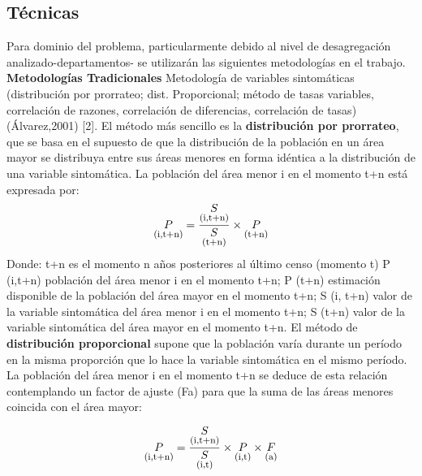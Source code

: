 \documentclass{article}
\theoremstyle{mytheoremstyle}
\theoremstyle{mytheoremstyle}
\theoremstyle{myproblemstyle}
\begin{document}
\subsection{Técnicas }
Para dominio del problema, particularmente debido al nivel de desagregación analizado-departamentos-
se utilizarán las siguientes metodologías en el trabajo.\newline
\textbf{Metodologías Tradicionales}\newline
Metodología de variables sintomáticas (distribución por prorrateo; dist. Proporcional; método de tasas variables,
 correlación de razones, correlación de diferencias, correlación de tasas) (Álvarez,2001) [2].
 \newline El método más sencillo es la \textbf{distribución por prorrateo}, que se
basa en el supuesto de que la distribución de la población en un área
mayor se distribuya entre sus áreas menores en forma idéntica a la
distribución de una variable sintomática. La población del área menor
i en el momento t+n está expresada por:
\begin{equation}
  \underset{\textstyle \text{\footnotesize(i,t+n)}}{P}=\frac{\underset{\textstyle \text{\footnotesize(i,t+n)}}{S}}{\underset{\textstyle\text{\footnotesize(t+n)}}{S}} \times \underset{\textstyle \text{\footnotesize(t+n)}}{P}
\end{equation}
Donde:\newline
t+n es el momento n años posteriores al último censo (momento t)\newline
P (i,t+n) población del área menor i en el momento t+n;\newline
P (t+n) estimación disponible de la población del área mayor en el momento t+n;\newline
S (i, t+n) valor de la variable sintomática del área menor i en el momento t+n;\newline
S (t+n) valor de la variable sintomática del área mayor en el momento t+n.\newline
El método de \textbf{distribución proporcional} supone que la población varía durante un período en
 la misma proporción que lo hace la variable sintomática en el mismo período. La población del área
menor i en el momento t+n se deduce de esta relación contemplando un factor de ajuste (Fa) para
que la suma de las áreas menores coincida con el área mayor:

\begin{equation}
  \underset{\textstyle \text{\footnotesize(i,t+n)}}{P}=\frac{\underset{\textstyle \text{\footnotesize(i,t+n)}}{S}}{\underset{\textstyle\text{\footnotesize(i,t)}}{S}}\times \underset{\textstyle \text{\footnotesize(i,t)}}{P}\times \underset{\textstyle \text{\footnotesize(a)}}{F}
\end{equation}
\end{document}
